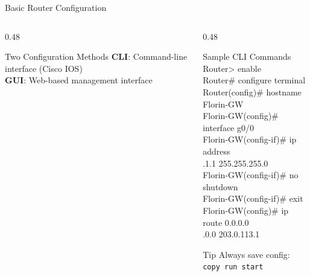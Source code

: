 \documentclass[aspectratio=169]{beamer}  %
\begin{document}
\begin{frame}{Basic Router Configuration}
\begin{columns}[T]
\begin{column}{0.48\textwidth}
            \vspace{0.2em}
            \begin{alertblock}{Two Configuration Methods}
                \small
                \textbf{CLI}: Command-line interface (Cisco IOS) \\
                \textbf{GUI}: Web-based management interface
            \end{alertblock}
        \end{column}
        \begin{column}{0.48\textwidth}
            \begin{block}{Sample CLI Commands}
                \ttfamily\scriptsize
                Router> enable \\
                Router\# configure terminal \\
                Router(config)\# hostname Florin-GW \\
                Florin-GW(config)\# interface g0/0 \\
                Florin-GW(config-if)\# ip address \\ 
                .1.1 255.255.255.0 \\
                Florin-GW(config-if)\# no shutdown \\
                Florin-GW(config-if)\# exit \\
                Florin-GW(config)\# ip route 0.0.0.0 \\
                .0.0 203.0.113.1
            \end{block}
            
            \vspace{0.2em}
            \begin{exampleblock}{Tip}
                \small
                Always save config: \texttt{copy run start}
            \end{exampleblock}
        \end{column}
    \end{columns}
\end{frame}
\end{document}

